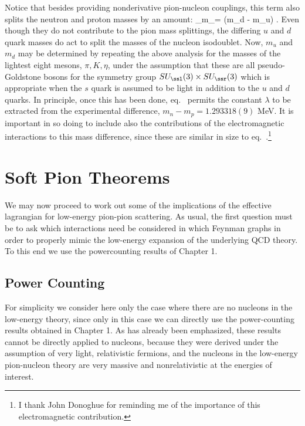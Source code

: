 \documentclass[12pt,epsf]{report}
\begin{document}
Notice that besides providing nonderivative pion-nucleon
couplings, this term also splits the neutron and proton
masses by an amount: 
%
\eq
\label{npmassdiff}
\delta_\lambda m_\ssn = \lambda (m_d - m_u) .
\eeq
%
Even though they do not contribute to the 
pion mass splittings, the differing $u$ and $d$ quark 
masses do act to split the masses of the
nucleon isodoublet. Now, $m_u$ and $m_d$
may be determined by repeating the above analysis for the
masses of the lightest eight mesons, 
$\pi, K, \eta$, under the assumption that these are all
pseudo-Goldstone bosons for the symmetry group $SU_\ssl(3)
\times SU_\ssr(3)$ which is appropriate when the $s$ quark
is assumed to be light in addition to the $u$ and $d$
quarks. In principle, once this has been done, 
eq.~
permits the constant $\lambda$ to be extracted from
the experimental difference, $m_n - m_p = 
1.293318(9)$ MeV. It is important in so doing to 
include also the contributions of the electromagnetic 
interactions to this mass difference, since these are
similar in size to eq.~.\footnote{I 
thank John Donoghue
for reminding me of the importance of this electromagnetic
contribution.}

\section{Soft Pion Theorems}

We may now proceed to work out some of the implications of
the effective lagrangian for low-energy pion-pion
scattering. As usual, the first question must be to ask
which interactions need be considered in which Feynman
graphs in order to properly mimic the low-energy expansion
of the underlying QCD theory. To this end we use the
powercounting results of Chapter 1.

\subsection{Power Counting}

For simplicity we consider here only the case where there
are no nucleons in the low-energy theory, since only in this
case we can directly use the power-counting results
obtained in Chapter 1. As has already been emphasized, 
these results cannot be directly applied to nucleons, 
because they were derived under the
assumption of very light, relativistic fermions, and the
nucleons in the low-energy pion-nucleon theory are very
massive and nonrelativistic at the energies of interest.
\end{document}
